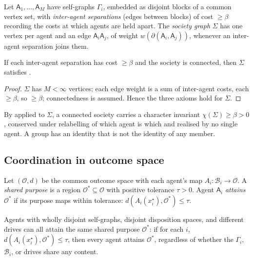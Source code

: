 \documentclass[11pt,twocolumn,a4paper]{article}
\newcommand{\Agent}{\mathsf{A}}
\newcommand{\Self}{\Gamma}          %
\newcommand{\wt}{w}
\newcommand{\floorc}{\beta}          %
\newcommand{\cut}{\partial}
\newcommand{\Char}{\chi}             %
\newcommand{\Beh}{\mathcal{B}}       %
\newcommand{\Purp}{x^{\star}}        %
\newcommand{\Soc}{\Sigma}            %
\newcommand{\Out}{\mathcal{O}}       %
\newcommand{\tol}{\tau}
\newcommand{\dist}{d}
\begin{document}
\begin{definition}
\label{def:society}
Let $\Agent_1,\dots,\Agent_M$ have self-graphs $\Self_i$, embedded as
disjoint blocks of a common vertex set, with \emph{inter-agent
separations} (edges between blocks) of cost $\ge\floorc$ recording the
costs at which agents are held apart. The \emph{society graph} $\Soc$ has
one vertex per agent and an edge $\Agent_i\Agent_j$, of weight
$\wt(\cut(\Agent_i,\Agent_j))$, whenever an inter-agent separation joins
them.
\end{definition}

\begin{lemma}
\label{lem:society-graph}
If each inter-agent separation has cost $\ge\floorc$ and the society is
connected, then $\Soc$ satisfies .
\end{lemma}

\begin{proof}
$\Soc$ has $M<\infty$ vertices; each edge weight is a sum of inter-agent
costs, each $\ge\floorc$, so $\ge\floorc$; connectedness is assumed. Hence
the three axioms hold for $\Soc$.
\end{proof}

\begin{corollary}
\label{cor:society-identity}
By  applied to $\Soc$, a connected society carries a
character invariant $\Char(\Soc)\ge\floorc>0$, conserved under relabelling
of which agent is which and realised by no single agent. A group has an
identity that is not the identity of any member.
\end{corollary}

\subsection{Coordination in outcome space}

\begin{definition}
\label{def:shared}
Let $(\Out,\dist)$ be the common outcome space with each agent's map
$A_i:\Beh_i\to\Out$. A \emph{shared purpose} is a region
$\Out^\ast\subseteq\Out$ with positive tolerance $\tol>0$. Agent
$\Agent_i$ \emph{attains} $\Out^\ast$ if its purpose maps within
tolerance: $\dist(A_i(\Purp_i),\Out^\ast)\le\tol$.
\end{definition}

\begin{theorem}
\label{thm:coord}
Agents with wholly disjoint self-graphs, disjoint disposition spaces, and
different drives can all attain the same shared purpose $\Out^\ast$: if for
each $i$, $\dist(A_i(\Purp_i),\Out^\ast)\le\tol$, then every agent attains
$\Out^\ast$, regardless of whether the $\Self_i$, $\Beh_i$, or drives share
any content.
\end{theorem}
\end{document}
